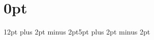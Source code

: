 %
%
%


\usepackage[a4paper, hmargin=20mm, vmargin=5mm, top=5mm]{geometry} %

\usepackage{fancyhdr} %

\usepackage{lastpage} %

\usepackage{hyperref} %


\usepackage{enumitem}

\setcounter{secnumdepth}{0} %

\usepackage[utf8]{inputenc} %
\usepackage[T1]{fontenc} %


\usepackage{color} %

\usepackage{sectsty} %
\sectionfont{\color{slateblue}\fontsize{12}{12}\selectfont} %

\usepackage{lipsum}
\usepackage[explicit]{titlesec}
\titlespacing{\paragraph}{0pt}{0pt}{0pt}
\titlespacing\section{0pt}{12pt plus 2pt minus 2pt}{5pt plus 2pt minus 2pt}


